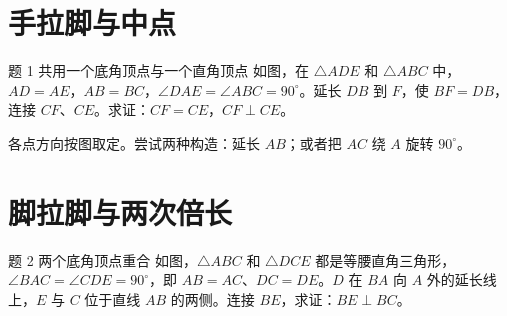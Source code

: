 \section{手拉脚与中点}
\begin{problem}{题 1 共用一个底角顶点与一个直角顶点}
如图，在 \(\triangle ADE\) 和 \(\triangle ABC\) 中，\(AD=AE\)，\(AB=BC\)，\(\angle DAE=\angle ABC=90^\circ\)。延长 \(DB\) 到 \(F\)，使 \(BF=DB\)，连接 \(CF\)、\(CE\)。求证：\(CF=CE\)，\(CF\perp CE\)。

各点方向按图取定。尝试两种构造：延长 \(AB\)；或者把 \(AC\) 绕 \(A\) 旋转 \(90^\circ\)。

\diagram{\hhOne}


\end{problem}
\clearpage
\section{脚拉脚与两次倍长}
\begin{problem}{题 2 两个底角顶点重合}
如图，\(\triangle ABC\) 和 \(\triangle DCE\) 都是等腰直角三角形，\(\angle BAC=\angle CDE=90^\circ\)，即 \(AB=AC\)、\(DC=DE\)。\(D\) 在 \(BA\) 向 \(A\) 外的延长线上，\(E\) 与 \(C\) 位于直线 \(AB\) 的两侧。连接 \(BE\)，求证：\(BE\perp BC\)。

\diagram{\hhTwo}


\end{problem}
\clearpage
